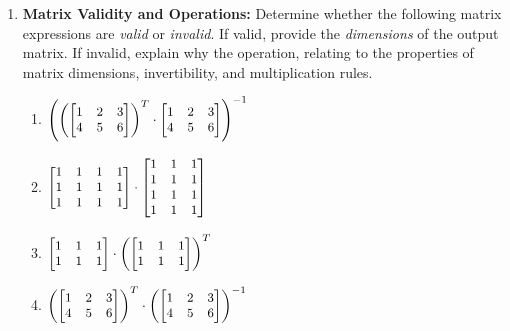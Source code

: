 \documentclass{16384_doc}
\begin{document}
\begin{enumerate}[label=\textbf{Question \alph*},leftmargin=*, align=left]
    \item[\textbf{Question a (10 points)}] \textbf{Matrix Validity and Operations:}
    Determine whether the following matrix expressions are \emph{valid} or \emph{invalid}. If valid, provide the \emph{dimensions} of the output matrix. If invalid, explain why the operation, relating to the properties of matrix dimensions, invertibility, and multiplication rules. %
    \begin{enumerate}[label=(\roman*)]

        \item $\small \left(\left(\begin{bmatrix} 1 & 2 & 3 \\ 4 & 5 & 6 \end{bmatrix}\right)^T \cdot \begin{bmatrix} 1 & 2 & 3 \\ 4 & 5 & 6 \end{bmatrix}\right)^{-1}$

        \item $\small \begin{bmatrix} 1 & 1 & 1 & 1 \\ 1 & 1 & 1 & 1 \\ 1 & 1 & 1 & 1 \end{bmatrix} \cdot \begin{bmatrix} 1 & 1 & 1 \\ 1 & 1 & 1 \\ 1 & 1 & 1 \\ 1 & 1 & 1 \end{bmatrix}$

        \item $\small \begin{bmatrix} 1 & 1 & 1 \\ 1 & 1 & 1 \end{bmatrix} \cdot \left(\begin{bmatrix} 1 & 1 & 1 \\ 1 & 1 & 1 \end{bmatrix}\right)^T$
        
        \item $\small \left(\begin{bmatrix} 1 & 2 & 3 \\ 4 & 5 & 6 \end{bmatrix}\right)^T \cdot \left(\begin{bmatrix} 1 & 2 & 3 \\ 4 & 5 & 6 \end{bmatrix}\right)^{-1}$
        

\end{enumerate}
\end{enumerate}
\end{document}
